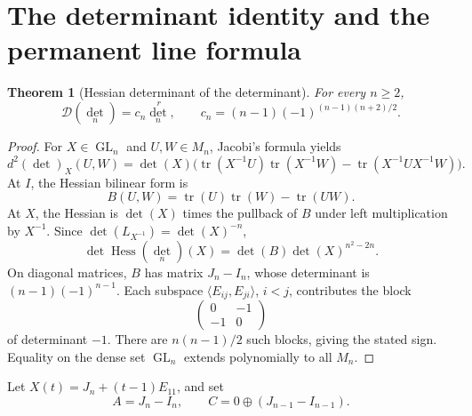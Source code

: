 \documentclass[11pt]{article}
\newtheorem{theorem}{Theorem}[section]
\theoremstyle{remark}
\DeclareMathOperator{\Hess}{Hess}
\DeclareMathOperator{\GL}{GL}
\newcommand{\Dcal}{\mathcal D}
\begin{document}
\section{The determinant identity and the permanent line formula}\label{sec:formulas}

\begin{theorem}[Hessian determinant of the determinant]\label{thm:detformula}
For every $n\geq2$,
\[
 \Dcal(\det_n)=c_n\det_n^{\,r},
 \qquad
 c_n=(n-1)(-1)^{(n-1)(n+2)/2}.
\]
\end{theorem}
\begin{proof}
For $X\in\GL_n$ and $U,W\in M_n$, Jacobi's formula yields
\[
 d^2(\det)_X(U,W)
 =\det(X)\bigl(\operatorname{tr}(X^{-1}U)\operatorname{tr}(X^{-1}W)
 -\operatorname{tr}(X^{-1}UX^{-1}W)\bigr).
\]
At $I$, the Hessian bilinear form is
\[
 B(U,W)=\operatorname{tr}(U)\operatorname{tr}(W)-\operatorname{tr}(UW).
\]
At $X$, the Hessian is $\det(X)$ times the pullback of $B$ under left multiplication by $X^{-1}$.  Since $\det(L_{X^{-1}})=\det(X)^{-n}$,
\[
 \det\Hess(\det_n)(X)=\det(B)\det(X)^{n^2-2n}.
\]
On diagonal matrices, $B$ has matrix $J_n-I_n$, whose determinant is $(n-1)(-1)^{n-1}$.  Each subspace $\langle E_{ij},E_{ji}\rangle$, $i<j$, contributes the block
\[
 \begin{pmatrix}0&-1\\-1&0\end{pmatrix}
\]
of determinant $-1$.  There are $n(n-1)/2$ such blocks, giving the stated sign.  Equality on the dense set $\GL_n$ extends polynomially to all $M_n$.
\end{proof}

Let $X(t)=J_n+(t-1)E_{11}$, and set
\[
 A=J_n-I_n,
 \qquad
 C=0\oplus(J_{n-1}-I_{n-1}).
\]
\end{document}
